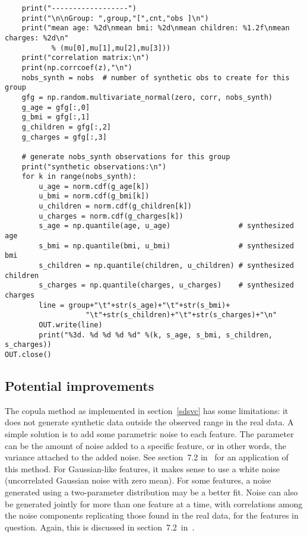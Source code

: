 \documentclass[oneside,10pt]{book}
\begin{document}
\begin{lstlisting}
    print("------------------")
    print("\n\nGroup: ",group,"[",cnt,"obs ]\n")
    print("mean age: %2d\nmean bmi: %2d\nmean children: %1.2f\nmean charges: %2d\n"
           % (mu[0],mu[1],mu[2],mu[3]))
    print("correlation matrix:\n")
    print(np.corrcoef(z),"\n")
    nobs_synth = nobs  # number of synthetic obs to create for this group
    gfg = np.random.multivariate_normal(zero, corr, nobs_synth)
    g_age = gfg[:,0]
    g_bmi = gfg[:,1]
    g_children = gfg[:,2]
    g_charges = gfg[:,3]

    # generate nobs_synth observations for this group
    print("synthetic observations:\n")
    for k in range(nobs_synth):
        u_age = norm.cdf(g_age[k])
        u_bmi = norm.cdf(g_bmi[k])
        u_children = norm.cdf(g_children[k])
        u_charges = norm.cdf(g_charges[k])
        s_age = np.quantile(age, u_age)                # synthesized age
        s_bmi = np.quantile(bmi, u_bmi)                # synthesized bmi
        s_children = np.quantile(children, u_children) # synthesized children
        s_charges = np.quantile(charges, u_charges)    # synthesized charges
        line = group+"\t"+str(s_age)+"\t"+str(s_bmi)+
                   "\t"+str(s_children)+"\t"+str(s_charges)+"\n"
        OUT.write(line)
        print("%3d. %d %d %d %d" %(k, s_age, s_bmi, s_children, s_charges))
OUT.close()
\end{lstlisting}

\subsection{Potential improvements}\label{babel99}

The copula method as implemented in section~\ref{sdsvc} has some limitations: it does not generate synthetic data outside the observed range in the real data. A simple solution is to add some parametric noise to each feature. The parameter can be the amount of noise added to a specific
 feature, or in other words, the variance attached to the added noise. See section~7.2 in~\cite{vgelsevier} for an application of this method. For Gaussian-like features, it makes sense to use a white noise (uncorrelated
 Gaussian noise with zero mean). For some features, a noise generated using a two-parameter distribution may be a better fit. Noise can also be generated jointly for more than one feature at a time, with correlations among the noise components replicating those found in the real data, for the features in question.
 Again, this is discussed in section~7.2~in~\cite{vgelsevier}.
\end{document}
